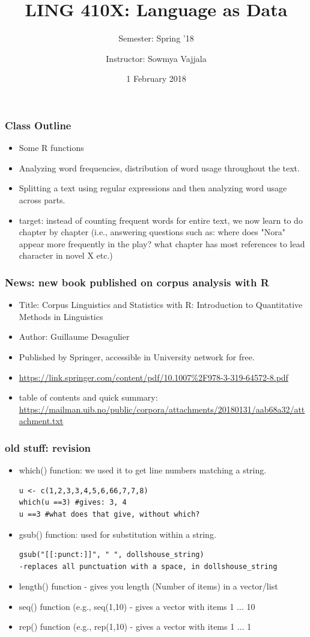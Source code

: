 \documentclass{beamer}
\author[Sowmya Vajjala]{Instructor: Sowmya Vajjala}
\title[LING 410X]{LING 410X: Language as Data}
\subtitle{Semester: Spring '18}
\date{1 February 2018}
\institute{Iowa State University, USA}
\begin{document}
\begin{frame}\titlepage
\end{frame}

\begin{frame}
\frametitle{Class Outline}
\begin{itemize}
\item Some R functions
\item Analyzing word frequencies, distribution of word usage throughout the text. %
\item Splitting a text using regular expressions and then analyzing word usage across parts. %
\item target: instead of counting frequent words for entire text, we now learn to do chapter by chapter (i.e.,  answering questions such as: where does "Nora" appear more frequently in the play? what chapter has most references to lead character in novel X etc.)
\end{itemize}
\end{frame}

\begin{frame}
\frametitle{News: new book published on corpus analysis with R}
\begin{itemize}
\item Title: Corpus Linguistics and Statistics with R: Introduction to Quantitative Methods in Linguistics
\item Author: Guillaume Desagulier
\item Published by Springer, accessible in University network for free.
\item \url{https://link.springer.com/content/pdf/10.1007\%2F978-3-319-64572-8.pdf}
\item table of contents and quick summary: \url{https://mailman.uib.no/public/corpora/attachments/20180131/aab68a32/attachment.txt}
\end{itemize}
\end{frame}

\begin{frame}[fragile]
\frametitle{old stuff: revision}
\begin{itemize}
\item which() function: we used it to get line numbers matching a string.
\scriptsize
\begin{verbatim}
u <- c(1,2,3,3,4,5,6,66,7,7,8)
which(u ==3) #gives: 3, 4
u ==3 #what does that give, without which?
\end{verbatim} \pause \small
\item gsub() function: used for substitution within a string.
\scriptsize
\begin{verbatim}
gsub("[[:punct:]]", " ", dollshouse_string)
-replaces all punctuation with a space, in dollshouse_string
\end{verbatim} \small \pause
\item length() function - gives you length (Number of items) in a vector/list
\item seq() function (e.g., seq(1,10) - gives a vector with items 1 ... 10
\item rep() function (e.g., rep(1,10) - gives a vector with items 1 ... 1
\end{itemize}
\end{frame}
\end{document}
